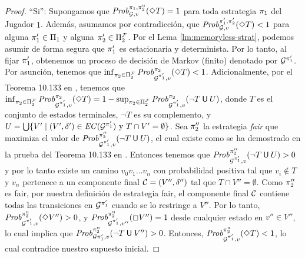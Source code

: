 \begin{proof}
``Si'': Supongamos que $\mathit{Prob}^{\pi_{1}, \pi^{\mathrm{u}}_{2}}_{\mathcal{G},v}(\Diamond T)=1$ para toda estrategia $\pi_{1}$ del Jugador $1$.  Además, 
asumamos por contradicción, que
$\mathit{Prob}^{\pi_{1}', \pi_{2}'}_{\mathcal{G},v}(\Diamond T) < 1$ para alguna $\pi_{1}'\in \Pi_{1}$ y alguna $\pi_{2}'\in \Pi^{\mathcal{F}}_{2}$. 
Por el Lema \ref{lm:memoryless-strat}, podemos asumir de forma segura que $\pi_{1}'$ es estacionaria y determinista.
Por lo tanto, al fijar $\pi_{1}'$, obtenemos un proceso de decisión de Markov (finito) denotado por $\mathcal{G}^{\pi_{1}'}$.
Por asunción, tenemos que
$\inf_{\pi_{2} \in \Pi^{\mathcal{F}}_{2}} \mathit{Prob}^{\pi_{2}}_{\mathcal{G}^{\pi_{1}'},v}(\Diamond T) < 1 $. Adicionalmente, por el Teorema 10.133 en \cite{BaierK08}, tenemos que $\inf_{ \pi_{2} \in \Pi^{\mathcal{F}}_{2}}\mathit{Prob}^{\pi_{2}}_{\mathcal{G}^{\pi_{1}'},v}(\Diamond T) = 1 - \sup_{\pi_{2} \in \Pi^{\mathcal{F}}_{2}} \mathit{Prob}^{\pi_{2}}_{\mathcal{G}^{\pi_{1}'},v}(\neg T \mathbin{\textsf{U}} U)$, donde $T$ es el conjunto de estados terminales,  $\neg T$ es su complemento, y
$U = \bigcup \{ V' \mid (V', \delta') \in \mathit{EC}(\mathcal{G}^{\pi_{1}'}) \text{ y }  T \cap V' = \emptyset\}$.
Sea $\pi_{2}''$ la estrategia \emph{fair} que maximiza el valor de $\mathit{Prob}^{\pi_{2}''}_{\mathcal{G}^{\pi_{1}'},v}(\neg T \mathbin{\textsf{U}} U)$, el cual existe como se ha demostrado en la prueba del Teorema 10.133 en \cite{BaierK08}.
Entonces tenemos que $\mathit{Prob}^{\pi_{2}''}_{\mathcal{G}^{\pi_{1}'},v}(\neg T \mathbin{\textsf{U}} U) > 0$ y por lo tanto existe
un camino $v_0 v_1 \dots v_n$ con probabilidad positiva tal que $v_i \notin T$ y $v_n$ pertenece a un componente final $\mathcal{C} = (V'', \delta'')$
tal que $T \cap V'' = \emptyset$. Como $\pi_{2}''$ es fair, por nuestra definición de estrategia fair, el componente final $\mathcal{C}$ contiene todas las transiciones en $\mathcal{G}^{\pi_{1}'}$ cuando se lo restringe a $V''$.
Por lo tanto, $\mathit{Prob}^{\pi^{\mathrm{u}}_{2}}_{\mathcal{G}^{\pi_{1}'},v}(\Diamond V'') > 0$, y 
$\mathit{Prob}^{\pi^{\mathrm{u}}_{2}}_{\mathcal{G}^{\pi_{1}'},v''}(\Box V'') = 1 $ 
desde cualquier estado en $v'' \in V''$, lo cual implica que $\mathit{Prob}^{\pi^{\mathrm{u}}_{2}}_{\mathcal{G}{\pi_{1}'},v}(\neg T \mathbin{\textsf{U}} V'') > 0$. 
Entonces, $\mathit{Prob}^{\pi^{\mathrm{u}}_{2}}_{\mathcal{G}^{\pi_{1}'},v}(\Diamond T) < 1$, lo cual contradice nuestro supuesto inicial.


\end{proof}
